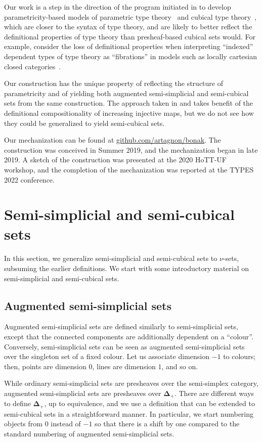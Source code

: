 \documentclass{msc}
\newcommand{\DeltaPlus}{\ensuremath{\boldsymbol{\Delta}_+}}
\begin{document}
Our work is a step in the direction of the program initiated in \cite{altenkirch15} to develop parametricity-based models of parametric type theory~\citep{bernardy15,nuyts17,cavallo19} and cubical type theory~\citep{bezem13,cohen16,angiuli21}, which are closer to the syntax of type theory, and are likely to better reflect the definitional properties of type theory than presheaf-based cubical sets would. For example, consider the loss of definitional properties when interpreting ``indexed'' dependent types of type theory as ``fibrations'' in models such as locally cartesian closed categories~\citep{curien14}.

Our construction has the unique property of reflecting the structure of parametricity and of yielding both augmented semi-simplicial and semi-cubical sets from the same construction. The approach taken in \cite{part15} and \cite{altenkirch16} takes benefit of the definitional compositionality of increasing injective maps, but we do not see how they could be generalized to yield semi-cubical sets.

Our mechanization can be found at \href{https://github.com/artagnon/bonak}{github.com/artagnon/bonak}. The construction was conceived in Summer 2019, and the mechanization began in late 2019. A sketch of the construction was presented at the 2020 HoTT-UF workshop, and the completion of the mechanization was reported at the TYPES 2022 conference.

\section{Semi-simplicial and semi-cubical sets\label{sec:nu}}
In this section, we generalize semi-simplicial and semi-cubical sets to $\nu$-sets, subsuming the earlier definitions. We start with some introductory material on semi-simplicial and semi-cubical sets.

\subsection*{Augmented semi-simplicial sets}
Augmented semi-simplicial sets are defined similarly to semi-simplicial sets, except that the connected components are additionally dependent on a ``colour''. Conversely, semi-simplicial sets can be seen as augmented semi-simplicial sets over the singleton set of a fixed colour. Let us associate dimension $-1$ to colours; then, points are dimension $0$, lines are dimension $1$, and so on.

While ordinary semi-simplicial sets are presheaves over the semi-simplex category, augmented semi-simplicial sets are presheaves over \DeltaPlus. There are different ways to define \DeltaPlus, up to equivalence, and we use a definition that can be extended to semi-cubical sets in a straightforward manner. In particular, we start numbering objects from $0$ instead of $-1$ so that there is a shift by one compared to the standard numbering of augmented semi-simplicial sets.
\end{document}
